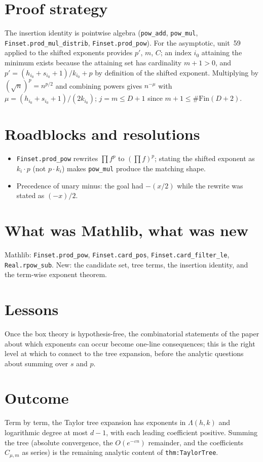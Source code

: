 \documentclass[11pt]{article}
\begin{document}
\section{Proof strategy}
The insertion identity is pointwise algebra (\texttt{pow\_add}, \texttt{pow\_mul},
\texttt{Finset.prod\_mul\_distrib}, \texttt{Finset.prod\_pow}). For the asymptotic, unit~59 applied to the
shifted exponents provides $p'$, $m$, $C$; an index $i_0$ attaining the minimum exists because the
attaining set has cardinality $m+1>0$, and $p'=(h_{i_0}+s_{i_0}+1)/k_{i_0}+p$ by definition of the
shifted exponent. Multiplying by $(\sqrt n)^p=n^{p/2}$ and combining powers gives
$n^{-\mu}$ with $\mu=(h_{i_0}+s_{i_0}+1)/(2k_{i_0})$; $j=m\le D+1$ since $m+1\le\#\mathrm{Fin}(D+2)$.

\section{Roadblocks and resolutions}
\begin{itemize}
\item \texttt{Finset.prod\_pow} rewrites $\prod f^p$ to $(\prod f)^p$; stating the shifted exponent as
$k_i\cdot p$ (not $p\cdot k_i$) makes \texttt{pow\_mul} produce the matching shape.
\item Precedence of unary minus: the goal had $-(x/2)$ while the rewrite was stated as $(-x)/2$.
\end{itemize}

\section{What was Mathlib, what was new}
Mathlib: \texttt{Finset.prod\_pow}, \texttt{Finset.card\_pos}, \texttt{Finset.card\_filter\_le},
\texttt{Real.rpow\_sub}. New: the candidate set, tree terms, the insertion identity, and the term-wise
exponent theorem.

\section{Lessons}
Once the box theory is hypothesis-free, the combinatorial statements of the paper about which
exponents can occur become one-line consequences; this is the right level at which to connect to the
tree expansion, before the analytic questions about summing over $s$ and $p$.

\section{Outcome}
Term by term, the Taylor tree expansion has exponents in $\Lambda(h,k)$ and logarithmic degree at most
$d-1$, with each leading coefficient positive. Summing the tree (absolute convergence, the
$O(e^{-\varepsilon n})$ remainder, and the coefficients $C_{\mu,m}$ as series) is the remaining
analytic content of \texttt{thm:TaylorTree}.
\end{document}
